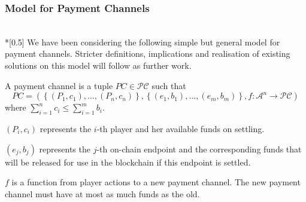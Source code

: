 \subsubsection{Model for Payment Channels} \ \\*[0.5\baselineskip]
  We have been considering the following simple but general model for payment channels.
  Stricter definitions, implications and realisation of existing solutions on this model
  will follow as further work.

  A payment channel is a tuple $PC \in \mathcal{PC}$ such that
  \begin{equation*}
    PC = \left(\left\{\left(P_1, c_1\right), \dots, \left(P_n, c_n\right)\right\},
    \left\{\left(e_1, b_1\right), \dots, \left(e_m, b_m\right)\right\}, f : \mathcal{A}^n
    \rightarrow \mathcal{PC}\right)
  \end{equation*}
  where $\sum\limits_{i = 1}^n c_i \leq \sum\limits_{i = 1}^m b_i$.

  $\left(P_i, c_i\right)$ represents the $i$-th player and her available funds on
  settling.

  $\left(e_j, b_j\right)$ represents the $j$-th on-chain endpoint and the corresponding
  funds that will be released for use in the blockchain if this endpoint is settled.

  $f$ is a function from player actions to a new payment channel. The new payment channel
  must have at most as much funds as the old.
